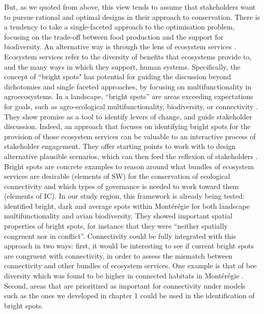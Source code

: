 \documentclass[12pt,Bold,TexShade]{thesis/mcgilletdclass}
\begin{document}
{But, as we quoted from \cite{williamson_spatially_2018} above, this view tends to assume that stakeholders want to pursue rational and optimal designs in their approach to conservation. There is a tendency to take a single-faceted approach to the optimisation problem, focusing on the trade-off between food production and the support for biodiversity. An alternative way is through the lens of ecosystem services  \citep{bennett_changing_2017}. Ecosystem services refer to the diversity of benefits that ecosystems provide to, and the many ways in which they support, human systems. Specifically, the concept of “bright spots" has potential for guiding the discussion beyond dichotomies and single faceted approaches, by focusing on multifunctionality in agroecosystems. In a landscape, “bright spots” are areas exceeding expectations for goals, such as agro-ecological multifunctionality, biodiversity, or connectivity \citep{frei_bright_2018}. They show promise as a tool to identify levers of change, and guide stakeholder discussion. Indeed, an approach that focuses on identifying bright spots for the provision of those ecosystem services can be valuable to an interactive process of stakeholder engagement. They offer starting points to work with to design alternative plausible scenarios, which can then feed the reflexion of stakeholders \citep{bernier_modelisation_2013, theau_evaluation_2015}. Bright spots are concrete examples to reason around what bundles of ecosystem services are desirable (elements of SW) for the conservation of ecological connectivity and which types of governance is needed to work toward them (elements of IC). In our study region, this framework is already being tested: \cite{frei_bright_2018} identified bright, dark and average spots within Montérégie for both landscape multifunctionality and avian biodiversity. They showed important spatial properties of bright spots, for instance that they were “neither spatially congruent nor in conflict”. Connectivity could be fully integrated with this approach in two ways: first, it would be interesting to see if current bright spots are congruent with connectivity, in order to assess the mismatch between connectivity and other bundles of ecosystem services. One example is that of bee diversity which was found to be higher in connected habitats in Montérégie \citep{martins_complementary_2018}. Second, areas that are prioritized as important for connectivity under models such as the ones we developed in chapter 1 could be used in the identification of bright spots. \\

}
\end{document}
